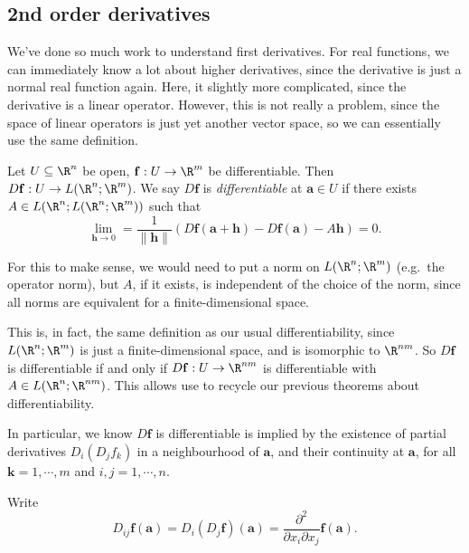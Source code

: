 \documentclass[a4paper]{article}
\begin{document}
\subsection{2nd order derivatives}
We've done so much work to understand first derivatives. For real functions, we can immediately know a lot about higher derivatives, since the derivative is just a normal real function again. Here, it slightly more complicated, since the derivative is a linear operator. However, this is not really a problem, since the space of linear operators is just yet another vector space, so we can essentially use the same definition.

\begin{defi}[2nd derivative]
  Let $U \subseteq \R^n$ be open, $\mathbf{f}: U \to \R^m$ be differentiable. Then $D\mathbf{f}: U \to L(\R^n; \R^m)$. We say $D\mathbf{f}$ is \emph{differentiable} at $\mathbf{a} \in U$ if there exists $A \in L(\R^n; L(\R^n; \R^m))$ such that
  \[
    \lim_{\mathbf{h} \to 0} = \frac{1}{\|\mathbf{h}\|} (D\mathbf{f}(\mathbf{a} + \mathbf{h}) - D \mathbf{f}(\mathbf{a}) - A \mathbf{h}) = 0.
  \]
\end{defi}
For this to make sense, we would need to put a norm on $L(\R^n; \R^m)$ (e.g.\ the operator norm), but $A$, if it exists, is independent of the choice of the norm, since all norms are equivalent for a finite-dimensional space.

This is, in fact, the same definition as our usual differentiability, since $L(\R^n; \R^m)$ is just a finite-dimensional space, and is isomorphic to $\R^{nm}$. So $D\mathbf{f}$ is differentiable if and only if $D\mathbf{f}: U \to \R^{nm}$ is differentiable with $A \in L(\R^n; \R^{nm})$. This allows use to recycle our previous theorems about differentiability.

In particular, we know $D\mathbf{f}$ is differentiable is implied by the existence of partial derivatives $D_i (D_j f_k)$ in a neighbourhood of $\mathbf{a}$, and their continuity at $\mathbf{a}$, for all $\mathbf{k} = 1, \cdots, m$ and $i, j = 1, \cdots, n$.

\begin{notation}
  Write
  \[
    D_{ij} \mathbf{f}(\mathbf{a}) = D_i(D_j \mathbf{f})(\mathbf{a}) = \frac{\partial^2}{\partial x_i \partial x_j} \mathbf{f}(\mathbf{a}).
  \]
\end{notation}
\end{document}
